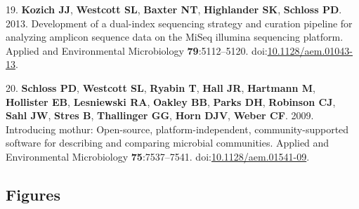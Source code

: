 \documentclass[11pt,]{article}
\begin{document}
\hypertarget{ref-Kozich2013}{}
19. \textbf{Kozich JJ}, \textbf{Westcott SL}, \textbf{Baxter NT},
\textbf{Highlander SK}, \textbf{Schloss PD}. 2013. Development of a
dual-index sequencing strategy and curation pipeline for analyzing
amplicon sequence data on the MiSeq illumina sequencing platform.
Applied and Environmental Microbiology \textbf{79}:5112--5120.
doi:\href{https://doi.org/10.1128/aem.01043-13}{10.1128/aem.01043-13}.

\hypertarget{ref-Schloss2009}{}
20. \textbf{Schloss PD}, \textbf{Westcott SL}, \textbf{Ryabin T},
\textbf{Hall JR}, \textbf{Hartmann M}, \textbf{Hollister EB},
\textbf{Lesniewski RA}, \textbf{Oakley BB}, \textbf{Parks DH},
\textbf{Robinson CJ}, \textbf{Sahl JW}, \textbf{Stres B},
\textbf{Thallinger GG}, \textbf{Horn DJV}, \textbf{Weber CF}. 2009.
Introducing mothur: Open-source, platform-independent,
community-supported software for describing and comparing microbial
communities. Applied and Environmental Microbiology
\textbf{75}:7537--7541.
doi:\href{https://doi.org/10.1128/aem.01541-09}{10.1128/aem.01541-09}.

\newpage

\subsection{Figures}\label{figures}
\end{document}
